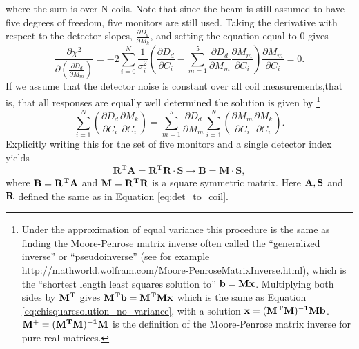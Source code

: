 where the sum is over N coils. Note that since the beam is still assumed to have five degrees of freedom, five monitors are still used. Taking the derivative with respect to the detector slopes, $\frac{\partial D_d}{\partial M_k}$, and setting the equation equal to 0 gives
\[
\frac{\partial\chi^2}{\partial\left( \frac{\partial D_d}{\partial M_m}\right)}=-2\sum_{i=0}^N\frac{1}{\sigma_i^2}\left(\frac{\partial D_d}{\partial C_i}- \sum_{m=1}^{5}\frac{\partial D_d}{\partial M_m}\frac{\partial M_m}{\partial C_i} \right)\frac{\partial M_m}{\partial C_i} = 0.
\]
If we assume that the detector noise is constant over all coil measurements,that is, that all responses are equally well determined the solution is given by
\footnote{Under the approximation of equal variance this procedure is the same as finding the Moore-Penrose matrix inverse often called the ``generalized inverse'' or ``pseudoinverse'' (see for example http://mathworld.wolfram.com/Moore-PenroseMatrixInverse.html), which is the ``shortest length least squares solution to'' ${\bf b=Mx}$. Multiplying both sides by ${\bf M^T}$ gives  ${\bf M^Tb=M^TMx}$ which is the same as Equation \ref{eq:chisquaresolution_no_variance}, with a solution  ${\bf x=(M^TM)^{-1}Mb}$. {$\bf M^+=(M^TM)^{-1}M$} is the definition of the Moore-Penrose matrix inverse for pure real matrices.}
\begin{equation}
\sum_{i=1}^N\left(\frac{\partial D_d}{\partial C_i}\frac{\partial M_k}{\partial C_i}\right) = \sum_{m=1}^5\frac{\partial D_d}{\partial M_m}\sum_{i=1}^N\left(\frac{\partial M_m}{\partial C_i}\frac{\partial M_k}{\partial C_i} \right). 
\label{eq:chisquaresolution_no_variance}
\end{equation}
Explicitly writing this for the set of five monitors and a single detector index yields
\[
\mathbf{R^TA=R^TR\cdot S}\longrightarrow\mathbf{B=M\cdot S},
\]
where ${\bf B=R^TA}$ and ${\bf M=R^TR}$ is a square symmetric matrix. Here ${\bf A, S}$ and ${\bf R}$ defined the same as in Equation \ref{eq:det_to_coil}.
